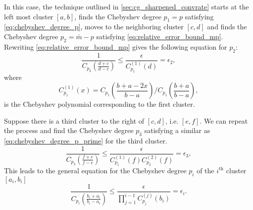 In this case, the technique outlined in \cref{sec:cg_sharpened_convrate} starts at the left most cluster $[a,b]$, finds the Chebyshev degree $p_1=p$ satisfying \cref{eq:chebyshev_degree_p}, moves to the neighboring cluster $[c,d]$ and finds the Chebyshev degree $p_2 = \bar{m} - p$ satisfying \cref{eq:relative_error_bound_mp}. Rewriting \cref{eq:relative_error_bound_mp} gives the following equation for $p_2$:
\begin{equation}
    \frac{1}{C_{p_2}\left(\frac{d+c}{d-c}\right)} \leq \frac{\epsilon}{{C}^{(1)}_{p_1}(d)} = \epsilon_2,
    \label{eq:chebyshev_degree_p_prime}
\end{equation}
where
\[
    C^{(1)}_{p_1}(x) = C_{p_1}\left(\frac{b + a - 2x}{b - a}\right) /C_{p_1}\left(\frac{b+a}{b-a}\right),
\]
is the Chebyshev polynomial corresponding to the first cluster.

Suppose there is a third cluster to the right of $[c,d]$, i.e. $[e,f]$. We can repeat the process and find the Chebyshev degree $p_3$ satisfying a similar as \cref{eq:chebyshev_degree_p_prime} for the third cluster. 
\[
    \frac{1}{C_{p_3}\left(\frac{f+e}{f-e}\right)} \leq \frac{\epsilon}{C^{(1)}_{p_1}(f)C^{(2)}_{p_2}(f)} = \epsilon_3,
\]
This leads to the general equation for the Chebyshev degree $p_i$ of the $i^{\text{th}}$ cluster $[a_i, b_i]$
\begin{equation}
    \frac{1}{C_{p_i}\left(\frac{b_i + a_i}{b_i - a_i}\right)} \leq \frac{\epsilon}{\prod_{j=1}^{i-1} C^{(j)}_{p_j}(b_i)} = \epsilon_i.
    \label{eq:chebyshev_degree_p_i}
\end{equation}

